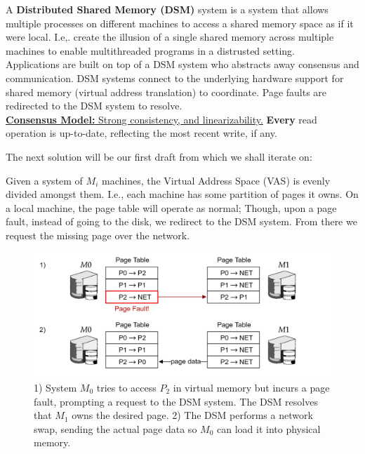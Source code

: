 \begin{Def}
    
    A \textbf{Distributed Shared Memory (DSM)} system is a system that allows multiple processes on different machines to access a shared memory space as if it were local.
    I.e,. create the illusion of a single shared memory across multiple machines to enable multithreaded programs in a distrusted setting.\\

    \noindent
    Applications are built on top of a DSM system who abstracts away consensus and communication. DSM systems 
    connect to the underlying hardware support for shared memory (virtual address translation) to coordinate.
    Page faults are redirected to the DSM system to resolve.\\

    \noindent
    \underline{\textbf{Consensus Model:} Strong consistency, and linearizability.} \textbf{Every} read operation is up-to-date, reflecting the most recent write, if any.

\end{Def}

\noindent
The next solution will be our first draft from which we shall iterate on:
\begin{Def}

    Given a system of $M_i$ machines, the Virtual Address Space (VAS) is evenly divided amongst them. I.e.,
    each machine has some partition of pages it owns. On a local machine, the page table will operate as normal;
    Though, upon a page fault, instead of going to the disk, we redirect to the DSM system. From there we request the missing page
    over the network.
\end{Def}

\begin{figure}[h]
    \centering
    \includegraphics[width=\textwidth]{Sections/shared/share.png}
    \caption{1) System $M_0$ tries to access $P_2$ in virtual memory but incurs a page fault, prompting a request to the DSM system. The DSM resolves that $M_1$ owns the desired page. 
    2) The DSM performs a network swap, sending the actual page data so $M_0$ can load it into physical memory.
    }
    \label{fig:dsm}
\end{figure}

